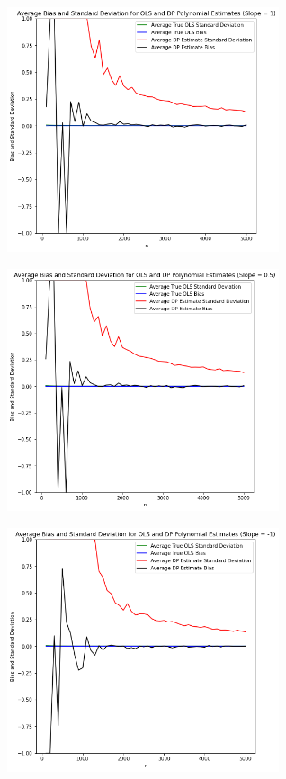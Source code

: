 \documentclass[11pt,conference]{IEEEtran}
\begin{document}
\begin{figure}[htbp]
\centerline{\includegraphics[width=8.0cm]{plots/Polynomial_1.png}}
\label{fig}
\end{figure}
\begin{figure}[htbp]
\centerline{\includegraphics[width=8.0cm]{plots/Polynomial_0.5.png}}
\label{fig}
\end{figure}
\begin{figure}[htbp]
\centerline{\includegraphics[width=8.0cm]{plots/Polynomial_-1.png}}
\label{fig}
\end{figure}
\newpage
\end{document}

